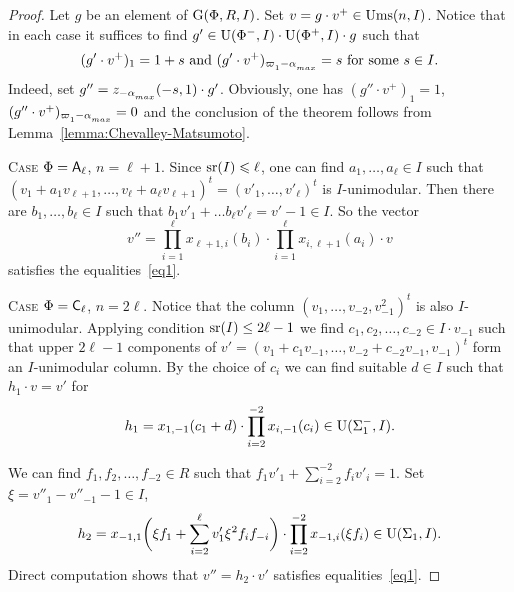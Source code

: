 \begin{proof}

Let $g$ be an element of $\operatorname{G}(\Phi, R, I)$. Set $v=g \cdot v^+\in\operatorname{Ums}(n, I)$. 
Notice that in each case it suffices to find $g' \in \operatorname{U}(\Phi^-, I) \cdot \operatorname{U}(\Phi^+, I) \cdot g$ such that 
\begin{equation} \label{eq1} (g'\cdot v^+)_{1} = 1 + s \text{ and } (g'\cdot v^+)_{\varpi\ssub{1}-\alpha\ssub{max}} = s\ \text{for some}\ s\in I. \end{equation}
Indeed, set $g'' = z_{-\alpha\ssub{max}}(-s, 1) \cdot g'$.
Obviously, one has $(g''\cdot v^+)_1 = 1$, $(g''\cdot v^+)_{\varpi\ssub{1}-\alpha\ssub{max}}=0$ and the conclusion of the theorem follows from Lemma~\ref{lemma:Chevalley-Matsumoto}.

\textsc{Case $\Phi=\mathsf{A}_\ell$, $n=\ell + 1$.}
Since $\operatorname{sr}(I)\leqslant\ell$, one can find $a_1,\ldots,a_\ell\in I$ such that $(v_1+a_1v_{\ell+1},\ldots,v_\ell+a_\ell v_{\ell+1})^t=(v'_1,\ldots,v'_\ell)^t$ is $I$-unimodular. Then there are $b_1,\ldots,b_\ell\in I$ such that $b_1v'_1+\ldots b_\ell v'_\ell=v'-1\in I$. So the vector
\[ v'' = \prod_{i=1}^\ell x_{\ell+1,i}(b_i) \cdot \prod_{i=1}^\ell x_{i,\ell+1}(a_i) \cdot v \]
satisfies the equalities~\ref{eq1}.

\textsc{Case $\Phi=\mathsf{C}_\ell$, $n=2\ell$.}
Notice that the column $(v_1,\ldots, v_{-2}, v_{-1}^2)^t$ is also $I$-unimodular.
Applying condition $\operatorname{sr}(I)\leq 2\ell-1$ we find $c_1, c_2, \ldots, c_{-2} \in I \cdot v_{-1}$ such that upper $2\ell -1$ components of $v'=(v_1 + c_1 v_{-1}, \ldots, v_{-2} + c_{-2}v_{-1}, v_{-1})^t$ form an $I$-unimodular column.
By the choice of $c_i$ we can find suitable $d\in I$ such that $h_1 \cdot v = v'$ for
\[ h_1 = x_{1,-1}(c_1 + d) \cdot \prod_{i=2}^{-2} x_{i,-1}(c_i) \in \operatorname{U}(\Sigma_1^-, I). \]

We can find $f_1, f_2,\ldots, f_{-2} \in R$ such that $f_1v'_1+\sum_{i=2}^{-2} f_i v'_i = 1$.
Set $\xi = v''_1-v''_{-1}-1 \in I$,
\[ h_2 = x_{-1,1}\biggl(\xi f_1 + \sum_{i=2}^\ell v_1' \xi^2 f_i f_{-i}\biggr) \cdot \prod_{i=2}^{-2} x_{-1,i}(\xi f_i) \in \operatorname{U}(\Sigma_1, I). \]
Direct computation shows that $v'' = h_2 \cdot v'$ satisfies equalities~\ref{eq1}.



\end{proof}
